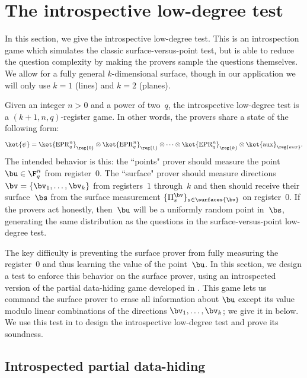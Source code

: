 \section{The introspective low-degree test}\label{sec:big-degree}

In this section, we give the introspective low-degree test.
This is an introspection game which simulates the classic surface-versus-point test,
but is able to reduce the question complexity by making the provers sample the questions themselves.
We allow for a fully general $k$-dimensional surface,
though in our application we will only use $k = 1$ (lines) and $k=2$ (planes).

Given an integer $n > 0$ and a power of two~$q$,
the introspective low-degree test is a $(k+1, n, q)$-register game.
In other words, the provers share a state of the following form:
\begin{equation*}
\ket{\psi}
=
\ket{\mathrm{EPR}_q^n}_{\reg{0}}
\otimes \ket{\mathrm{EPR}_q^n}_{\reg{1}}
\otimes
\cdots
\otimes
\ket{\mathrm{EPR}_q^n}_{\reg{k}}
\otimes
\ket{\mathrm{aux}}_{\reg{aux}}.
\end{equation*}
The intended behavior is this: the ``points" prover should measure the point $\bu \in \F_q^n$ from register~$0$.
The ``surface"  prover should measure directions $\bv = \{\bv_1, \ldots, \bv_k\}$ from registers~$1$ through~$k$
and then should receive their surface~$\bs$ from the surface measurement $\{\Pi^{\bv}_s\}_{s\in \surfaces{\bv}}$ on register~$0$.
If the provers act honestly, then~$\bu$ will be a uniformly random point in~$\bs$,
generating the same distribution as the questions in the surface-versus-point low-degree test.

The key difficulty is preventing the surface prover from fully
measuring the register~$0$ and thus learning the value of the point~$\bu$.
In this section, we design a test to enforce this behavior on the
surface prover, using an introspected version of the partial data-hiding game developed in .
This game lets us command the
surface prover to erase all information about $\bu$ except its value
modulo linear combinations of the directions $\bv_1, \dots, \bv_k$;
we give it in  below.
We use this test in   to design the introspective
low-degree test and prove its soundness.


\subsection{Introspected partial data-hiding}
\label{sec:ihide}

